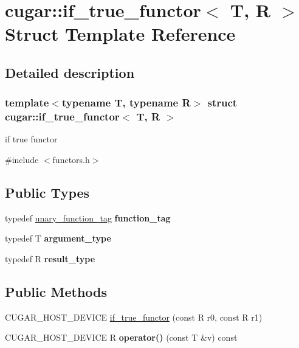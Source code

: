 \hypertarget{structcugar_1_1if__true__functor}{}\section{cugar\+:\+:if\+\_\+true\+\_\+functor$<$ T, R $>$ Struct Template Reference}
\label{structcugar_1_1if__true__functor}


\subsection{Detailed description}
\subsubsection*{template$<$typename T, typename R$>$\newline
struct cugar\+::if\+\_\+true\+\_\+functor$<$ T, R $>$}

if true functor 

{\ttfamily \#include $<$functors.\+h$>$}

\subsection*{Public Types}
\begin{DoxyCompactItemize}
\item 
\mbox{\label{structcugar_1_1if__true__functor_afa138a2b4d125cd344cf98d3abd65c87}} 
typedef \hyperlink{structcugar_1_1unary__function__tag}{unary\+\_\+function\+\_\+tag} {\bfseries function\+\_\+tag}
\item 
\mbox{\label{structcugar_1_1if__true__functor_a124aa5233c48f49ef7ebb54c5f88b953}} 
typedef T {\bfseries argument\+\_\+type}
\item 
\mbox{\label{structcugar_1_1if__true__functor_a80e80c8fbd4c1df18d331487ce75c7a1}} 
typedef R {\bfseries result\+\_\+type}
\end{DoxyCompactItemize}
\subsection*{Public Methods}
\begin{DoxyCompactItemize}
\item 
C\+U\+G\+A\+R\+\_\+\+H\+O\+S\+T\+\_\+\+D\+E\+V\+I\+CE \hyperlink{structcugar_1_1if__true__functor_a9374ed01b1416cc6eff2d6a5c8981a58}{if\+\_\+true\+\_\+functor} (const R r0, const R r1)
\item 
\mbox{\label{structcugar_1_1if__true__functor_a56bf028f68d05c61b8db504c60185939}} 
C\+U\+G\+A\+R\+\_\+\+H\+O\+S\+T\+\_\+\+D\+E\+V\+I\+CE R {\bfseries operator()} (const T \&v) const
\end{DoxyCompactItemize}


